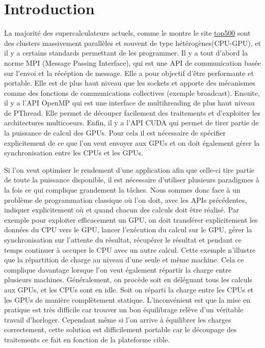 \documentclass[smallextended]{svjour3}
\begin{document}
\section{Introduction}
\label{sec-1}

La majorité des supercalculateurs actuels, comme le montre le site
\href{http://www.top500.org}{top500} sont des clusters massivement parallèles et souvent de type
hétérogènes(CPU-GPU), et il y a certains standards permettant de
les programmer. Il y a tout d'abord la norme MPI (Message Passing
Interface), qui est une API de communication basée sur l'envoi et la 
récéption de message. Elle a pour objectif d'être performante et
portable.  Elle est de plus haut niveau que les sockets et apporte
des mécanismes comme des fonctions de communications collectives
(exemple broadcast). Ensuite, il y a l'API OpenMP qui est une
interface de multihreading de plus haut niveau de PThread. Elle
permet de découper facilement des traitements et d'exploiter les
architectures multicoeurs. Enfin, il y a l'API CUDA qui permet de
tirer partie de la puissance de calcul des GPUs. Pour cela il est
nécessaire de spécifier explicitement de ce que l'on veut envoyer
aux GPUs et on doit également gérer la synchronisation entre les
CPUs et les GPUs.

Si l'on veut optimiser le rendement d'une application afin que
celle-ci tire partie de toute la puissance disponible, il est
nécessaire d'utiliser plusieurs paradigmes à la fois ce qui complique
grandement la tâches. Nous sommes donc face à un problème de
programmation classique où l'on doit, avec les APIs précédentes,
indiquer explicitement où et quand chacun des calculs doit être
réalisé. Par exemple pour exploiter efficacement un GPU, on doit
transférer explicitement les données du CPU vers le GPU, lancer
l'exécution du calcul sur le GPU, gérer la synchronisation sur
l'attente du résultat, récupérer le résultat et pendant ce temps
continuer à occuper le CPU avec un autre calcul. Cette exemple
n'illustre que la répartition de charge au niveau d'une seule et
même machine. Cela ce complique davantage lorsque l'on veut
également répartir la charge entre plusieurs machines. Généralement,
on procède soit en déléguant tous les calculs aux GPUs, et les CPUs
sont en idle. Soit on réparti la charge entre les CPUs et les GPUs
de manière complètement statique\cite{StarPU-MPI}. L'inconvénient
est que la mise en pratique est très difficile car trouver un bon
équilibrage relève d'un véritable travail d'horloger. Cependant même
si l'on arrive à équilibrer les charges correctement, cette solution
est difficilement portable car le découpage des traitements ce fait en
fonction de la plateforme cible. 
\end{document}
